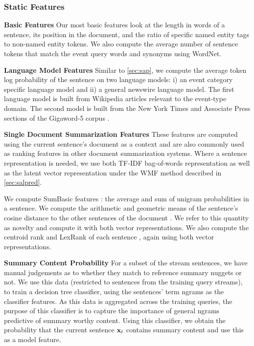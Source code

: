 \subsubsection{Static Features}

\textbf{Basic Features } Our most basic features look at the length in words of
a sentence, its position in the document, and the ratio of specific named
entity tags to non-named entity tokens.  We also compute the average number of
sentence tokens that match the event query words and synonyms using WordNet.

\textbf{Language Model Features } Similar to \autoref{sec:sap}, we compute the
average token log probability of the sentence on two language models: i) an
event category specific language model and ii) a general newswire language
model.  The first language model is built from Wikipedia articles relevant to
the event-type domain. The second model is built from the New York Times and
Associate Press sections of the Gigaword-5 corpus \citep{graff2003english}.

\textbf{Single Document Summarization Features } These features are computed
using the current sentence's document as a context and are also commonly used
as ranking features in other document summarization systems. Where a sentence
representation is needed, we use both TF-IDF bag-of-words representation as
well as the latent vector representation under the WMF method described in
\autoref{sec:salpred}.

We compute SumBasic features \citep{nenkova2005}: the average and sum of
unigram probabilities in a sentence.  We compute the arithmetic and geometric
means of the sentence's cosine distance to the other sentences of the document
\citep{guo2013}. We refer to this quantity as novelty and compute it with both
vector representations. We also compute the centroid rank \citep{radev2000} and
LexRank of each sentence \citep{erkan2004}, again using both vector
representations.

\textbf{Summary Content Probability} For a subset of the stream sentences, we
have manual judgements as to whether they match to reference summary nuggets or
not. We use this data (restricted to sentences from the training query
streams), to train a decision tree classifier, using the sentences' term ngrams
as the classifier features. As this data is aggregated across the training
queries, the purpose of this classifier is to capture the importance of general
ngrams predictive of summary worthy content.  Using this classifier, we obtain
the probability that the current sentence $\mathbf{x}_t$ contains summary
content and use this as a model feature.


